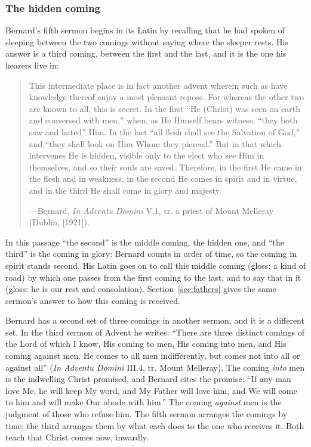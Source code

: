 \subsubsection{The hidden coming}

Bernard's fifth sermon begins in its Latin by recalling that he had spoken of sleeping between
the two comings without saying where the sleeper rests. His answer is a third coming, between the
first and the last, and it is the one his hearers live in:

\begin{quote}
This intermediate place is in fact another advent wherein such as have knowledge thereof enjoy
a most pleasant repose. For whereas the other two are known to all, this is secret. In the first
``He (Christ) was seen on earth and conversed with men,'' when, as He Himself bears witness,
``they both saw and hated'' Him. In the last ``all flesh shall see the Salvation of God,'' and
``they shall look on Him Whom they pierced.'' But in that which intervenes He is hidden, visible
only to the elect who see Him in themselves, and so their souls are saved. Therefore, in the
first He came in the flesh and in weakness, in the second He comes in spirit and in virtue, and
in the third He shall come in glory and majesty.\par
{\smallskip\noindent\small ---Bernard, \textit{In Adventu Domini} V.1, tr. a priest of Mount
Melleray (Dublin, [1921]).\par}
\end{quote}

In this passage ``the second'' is the middle coming, the hidden one, and ``the third'' is the
coming in glory: Bernard counts in order of time, so the coming in spirit stands second. His
Latin goes on to call this middle coming  (gloss: a kind of road) by which one
passes from the first coming to the last, and to say that in it  (gloss: he is our rest and consolation). Section~\ref{sec:fathers} gives the same
sermon's answer to how this coming is received.

Bernard has a second set of three comings in another sermon, and it is a different set. In the
third sermon of Advent he writes: ``There are three distinct comings of the Lord of which I
know, His coming to men, His coming into men, and His coming against men. He comes to all men
indifferently, but comes not into all or against all'' (\textit{In Adventu Domini} III.4, tr.
Mount Melleray). The coming \emph{into} men is the indwelling Christ promised, and Bernard cites
the promise: ``If any man love Me, he will keep My word, and My Father will love him, and We
will come to him and will make Our abode with him.'' The coming \emph{against} men is the
judgment of those who refuse him. The fifth sermon arranges the comings by time; the third
arranges them by what each does to the one who receives it. Both teach that Christ comes now,
inwardly.

